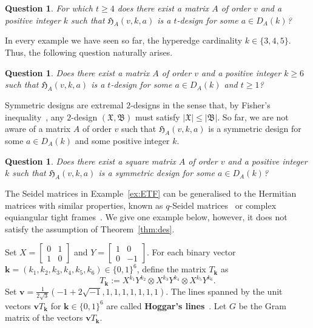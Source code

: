 \documentclass[11pt]{article}
\newtheorem{question}[theorem]{Question}
\begin{document}
\begin{question}
For which $t\geqslant 4$ does there exist a matrix $A$ of order $v$ and a positive integer $k$ such that $\mathfrak H_A(v,k,a)$ is a $t$-design for some $a \in D_A(k)$?
\end{question}

In every example we have seen so far, the hyperedge cardinality $k \in \{3,4,5\}$.
Thus, the following question naturally arises.

\begin{question}
Does there exist a matrix $A$ of order $v$ and a positive integer $k \geqslant 6$ such that $\mathfrak H_A(v,k,a)$ is a $t$-design for some $a \in D_A(k)$ and $t \geqslant 1$?
\end{question}



Symmetric designs are extremal $2$-designs in the sense that, by Fisher's inequality~\cite{fisher}, any $2$-design $(\mathfrak X,\mathfrak B)$ must satisfy $|\mathfrak X| \leqslant |\mathfrak B|$.
So far, we are not aware of a matrix $A$ of order $v$ such that $\mathfrak H_A(v,k,a)$ is a symmetric design for some $a\in D_A(k)$ and some positive integer $k$.

\begin{question}
Does there exist a square matrix $A$ of order $v$ and a positive integer $k$ such that $\mathfrak H_A(v,k,a)$ is a symmetric design for some $a\in D_A(k)$? 
\end{question}

The Seidel matrices in Example~\ref{ex:ETF} can be generalised to the Hermitian matrices with similar properties, known as $q$-Seidel matrices~\cite{GW} or complex equiangular tight frames~\cite{etf}.
We give one example below, however, it does not satisfy the assumption of Theorem~\ref{thm:des}.

Set $X = \left [ \begin{smallmatrix}
    0 & 1 \\ 1 & 0
\end{smallmatrix} \right ]$ and $Y = \left [ \begin{smallmatrix}
    1 & 0 \\ 0 & -1
\end{smallmatrix} \right ]$.
For each binary vector $\mathbf k = (k_1,k_2,k_3,k_4,k_5,k_6) \in \{0,1\}^6$, define the matrix $T_{\mathbf k}$ as
\[
T_{\mathbf k} := X^{k_1}Y^{k_2} \otimes X^{k_3}Y^{k_4} \otimes X^{k_5}Y^{k_6}. 
\]
Set $\mathbf v = \frac{1}{2\sqrt{3}}(-1+2\sqrt{-1},1,1,1,1,1,1,1)$.
The lines spanned by the unit vectors $\mathbf v T_{\mathbf k}$ for $\mathbf k \in \{0,1\}^6$ are called \textbf{Hoggar's lines}~\cite{H,JW}.
Let $G$ be the Gram matrix of the vectors $\mathbf v T_{\mathbf k}$. 
\end{document}
